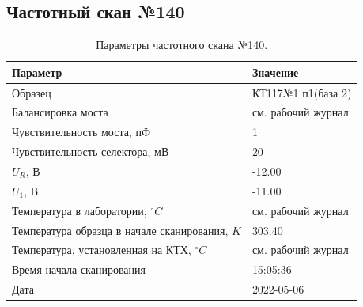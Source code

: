 \subsection{Частотный скан №140}
\begin{table}[!ht]
    \centering
    \caption{Параметры частотного скана №140.}
    \begin{tabular}{|l|l|}
        \hline
        Параметр                                       & Значение                  \\ \hline
        Образец                                        & КТ117№1 п1(база 2)        \\ \hline
        Балансировка моста                             & см. рабочий журнал        \\ \hline
        Чувствительность моста, пФ                     & 1                         \\ \hline
        Чувствительность селектора, мВ                 & 20                        \\ \hline
        $U_R$, В                                       & -12.00                    \\ \hline
        $U_1$, В                                       & -11.00                    \\ \hline
        Температура в лаборатории, $^\circ C$          & см. рабочий журнал        \\ \hline
        Температура образца в начале сканирования, $K$ & 303.40                    \\ \hline
        Температура, установленная на КТХ, $^\circ C$  & см. рабочий журнал        \\ \hline
        Время начала сканирования                      & 15:05:36                  \\ \hline
        Дата                                           & 2022-05-06                \\ \hline
    \end{tabular}
    \label{table:frequency_scan_140}
\end{table}


